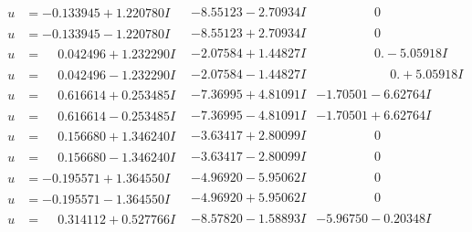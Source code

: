 \documentclass[1p]{elsarticle_modified}
\theoremstyle{definition}
\begin{document}
$$\begin{array}{c|c|c}
\begin{aligned}
u &= -0.133945 + 1.220780 I\end{aligned}
 & -8.55123 - 2.70934 I & \phantom{-0.000000 } 0 \\ \hline\begin{aligned}
u &= -0.133945 - 1.220780 I\end{aligned}
 & -8.55123 + 2.70934 I & \phantom{-0.000000 } 0 \\ \hline\begin{aligned}
u &= \phantom{-}0.042496 + 1.232290 I\end{aligned}
 & -2.07584 + 1.44827 I & \phantom{-0.000000 } 0. - 5.05918 I \\ \hline\begin{aligned}
u &= \phantom{-}0.042496 - 1.232290 I\end{aligned}
 & -2.07584 - 1.44827 I & \phantom{-0.000000 -}0. + 5.05918 I \\ \hline\begin{aligned}
u &= \phantom{-}0.616614 + 0.253485 I\end{aligned}
 & -7.36995 + 4.81091 I & -1.70501 - 6.62764 I \\ \hline\begin{aligned}
u &= \phantom{-}0.616614 - 0.253485 I\end{aligned}
 & -7.36995 - 4.81091 I & -1.70501 + 6.62764 I \\ \hline\begin{aligned}
u &= \phantom{-}0.156680 + 1.346240 I\end{aligned}
 & -3.63417 + 2.80099 I & \phantom{-0.000000 } 0 \\ \hline\begin{aligned}
u &= \phantom{-}0.156680 - 1.346240 I\end{aligned}
 & -3.63417 - 2.80099 I & \phantom{-0.000000 } 0 \\ \hline\begin{aligned}
u &= -0.195571 + 1.364550 I\end{aligned}
 & -4.96920 - 5.95062 I & \phantom{-0.000000 } 0 \\ \hline\begin{aligned}
u &= -0.195571 - 1.364550 I\end{aligned}
 & -4.96920 + 5.95062 I & \phantom{-0.000000 } 0 \\ \hline\begin{aligned}
u &= \phantom{-}0.314112 + 0.527766 I\end{aligned}
 & -8.57820 - 1.58893 I & -5.96750 - 0.20348 I \\ \hline\begin{aligned}

\end{aligned}
\end{array}$$
\end{document}
